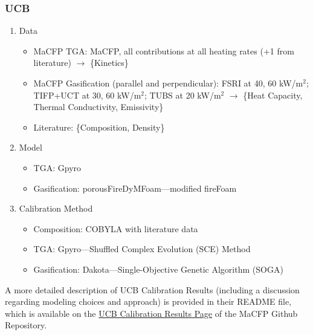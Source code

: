 \documentclass{article}
\begin{document}
\subsubsection*{UCB}
\begin{enumerate}
	\item Data
	\begin{itemize}
		\item MaCFP TGA: MaCFP, all contributions at all heating rates (+1 from literature) $\rightarrow$ \{Kinetics\}
		\item MaCFP Gasification (parallel and perpendicular): FSRI at 40, 60 kW/m$^2$; TIFP+UCT at 30, 60 kW/m$^2$; TUBS at 20 kW/m$^2$ $\rightarrow$ \{Heat Capacity, Thermal Conductivity, Emissivity\}
		\item Literature: \{Composition, Density\}
	\end{itemize}
	
	\item Model
	\begin{itemize}
		\item TGA: Gpyro
		\item Gasification: porousFireDyMFoam---modified fireFoam
	\end{itemize}
	
	\item Calibration Method
	\begin{itemize}
		\item Composition: COBYLA with literature data
		\item TGA: Gpyro---Shuffled Complex Evolution (SCE) Method
		\item Gasification: Dakota---Single-Objective Genetic Algorithm (SOGA)
	\end{itemize}
\end{enumerate}
A more detailed description of UCB Calibration Results (including a discussion regarding modeling choices and approach) is provided in their README file, which is available on the \href{https://github.com/MaCFP/matl-db/tree/master/Wood/Calibration_Results/UCB#readme}{UCB Calibration Results Page} of the MaCFP Github Repository.
\FloatBarrier

	
\end{document}
